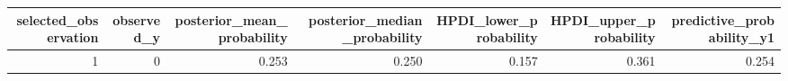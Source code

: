 \begin{tabular}{rrrrrrr}
  \hline
selected\_observation & observed\_y & posterior\_mean\_probability & posterior\_median\_probability & HPDI\_lower\_probability & HPDI\_upper\_probability & predictive\_probability\_y1 \\ 
  \hline
1 & 0 & 0.253 & 0.250 & 0.157 & 0.361 & 0.254 \\ 
   \hline
\end{tabular}
